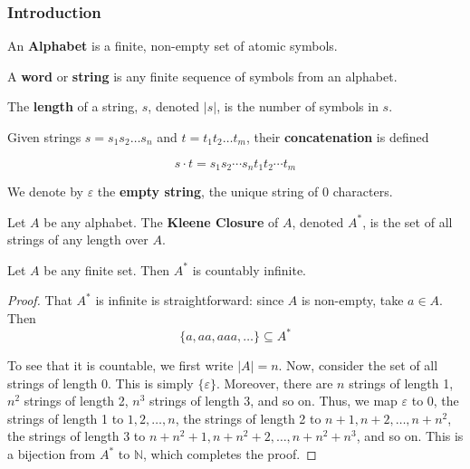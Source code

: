 \subsubsection{Introduction}\label{subsubsec:introduction}
\begin{definition}
 An \textbf{Alphabet} is a finite, non-empty set of atomic symbols.
\end{definition}

\begin{definition}
 A \textbf{word} or \textbf{string} is any finite sequence of symbols from an alphabet. 
\end{definition}

\begin{definition}
 The \textbf{length} of a string, \(s\), denoted \(|s|\), is the number of symbols in \(s\). 
\end{definition}

\begin{definition}
 Given strings \(s=s_1s_2\hdots s_n\) and \(t=t_1t_2\hdots t_m\), their \textbf{concatenation} is defined 
 
 \[s\cdot t=s_1s_2\cdots s_n t_1t_2\cdots t_m\]
\end{definition}

We denote by \(\varepsilon \) the \textbf{empty string}, the unique string of 0 characters. 

\begin{definition}
 Let \(A\) be any alphabet. The \textbf{Kleene Closure} of \(A\), denoted \(A^*\), is the set of all strings of any length over \(A\).  
\end{definition}

\begin{theorem}
 Let \(A\) be any finite set. Then \(A^*\) is countably infinite. 
\end{theorem}

\begin{proof}
 That \(A^*\) is infinite is straightforward: since \(A\) is non-empty, take \(a\in A\). Then \[ \{a, aa, aaa, \hdots \}\subseteq A^*\]
 
 To see that it is countable, we first write \(|A|=n\). Now, consider the set of all strings of length 0. This is simply \( \{\varepsilon \} \). Moreover, there are \(n\) strings of length 1, \(n^2\) strings of length 2, \(n^3\) strings of length 3, and so on. Thus, we map \(\varepsilon \) to 0, the strings of length 1 to \(1, 2, \hdots, n\), the strings of length 2 to \(n+1, n+2, \hdots, n+n^2\), the strings of length 3 to \(n+n^2+1, n+n^2+2,\hdots, n+n^2+n^3\), and so on. This is a bijection from \(A^*\) to \(\mathbb{N}\), which completes the proof.
\end{proof}

